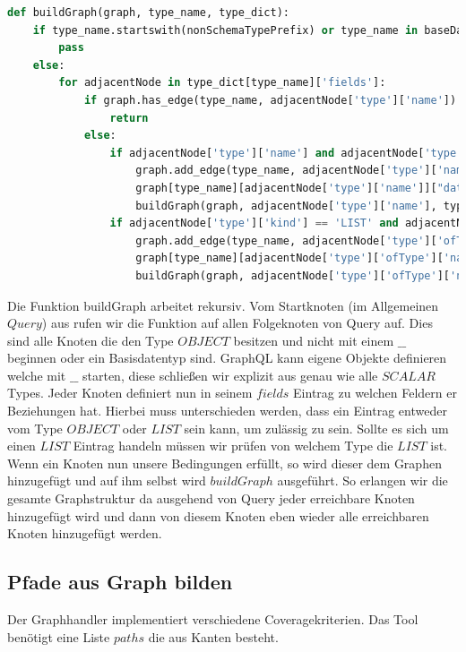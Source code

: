 \begin{lstlisting}[language=Python]
def buildGraph(graph, type_name, type_dict):
    if type_name.startswith(nonSchemaTypePrefix) or type_name in baseDatatypes:
        pass
    else:
        for adjacentNode in type_dict[type_name]['fields']:
            if graph.has_edge(type_name, adjacentNode['type']['name']):
                return
            else:
                if adjacentNode['type']['name'] and adjacentNode['type']['name'] not in baseDatatypes:
                    graph.add_edge(type_name, adjacentNode['type']['name'])
                    graph[type_name][adjacentNode['type']['name']]["data"] = adjacentNode
                    buildGraph(graph, adjacentNode['type']['name'], type_dict)
                if adjacentNode['type']['kind'] == 'LIST' and adjacentNode['type']['ofType']['name'] not in baseDatatypes:
                    graph.add_edge(type_name, adjacentNode['type']['ofType']['name'])
                    graph[type_name][adjacentNode['type']['ofType']['name']]["data"] = adjacentNode
                    buildGraph(graph, adjacentNode['type']['ofType']['name'], type_dict)

\end{lstlisting}

Die Funktion buildGraph arbeitet rekursiv.
Vom Startknoten (im Allgemeinen $Query$) aus rufen wir die Funktion auf allen Folgeknoten von Query auf.
Dies sind alle Knoten die den Type $OBJECT$ besitzen und nicht mit einem $\_\_$ beginnen oder ein Basisdatentyp sind.
GraphQL kann eigene Objekte definieren welche mit $\_\_$ starten, diese schließen wir explizit aus genau wie alle $SCALAR$ Types.
Jeder Knoten definiert nun in seinem $fields$ Eintrag zu welchen Feldern er Beziehungen hat.
Hierbei muss unterschieden werden, dass ein Eintrag entweder vom Type $OBJECT$ oder $LIST$ sein kann, um zulässig zu sein.
Sollte es sich um einen $LIST$ Eintrag handeln müssen wir prüfen von welchem Type die $LIST$ ist.
Wenn ein Knoten nun unsere Bedingungen erfüllt, so wird dieser dem Graphen hinzugefügt und auf ihm selbst wird $buildGraph$ ausgeführt.
So erlangen wir die gesamte Graphstruktur da ausgehend von Query jeder erreichbare Knoten hinzugefügt wird und dann von diesem Knoten eben wieder alle erreichbaren Knoten
hinzugefügt werden.

\subsection{Pfade aus Graph bilden}

Der Graphhandler implementiert verschiedene Coveragekriterien.
Das Tool benötigt eine Liste $paths$ die aus Kanten besteht.

